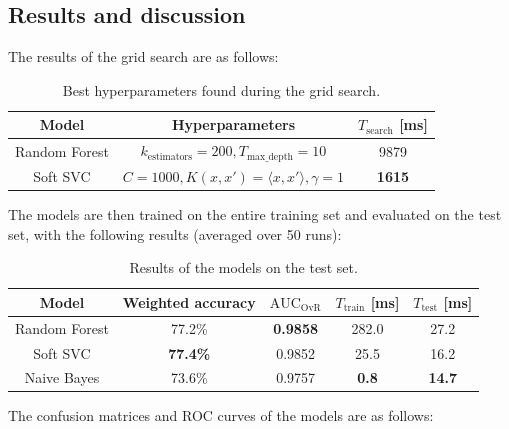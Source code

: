 \documentclass{article}
\begin{document}
\subsection{Results and discussion}
The results of the grid search are as follows:

\begin{table}[h]
    \centering
    \begin{tabular}{c|c|c}
        \toprule
        Model & Hyperparameters & $T_{\text{search}}$ [ms] \\
        \midrule
        Random Forest & $k_{\text{estimators}} = 200, T_{\text{max\_depth}} = 10$ & 9879 \\
        Soft SVC & $C = 1000, K(x, x') = \langle x, x' \rangle, \gamma = 1$ & \textbf{1615} \\
        \bottomrule
    \end{tabular}
    \caption{
        Best hyperparameters found during the grid search.
    }
    \label{tab:hyperparameters}
\end{table}

The models are then trained on the entire training set and evaluated on the test set, with the following results (averaged over 50 runs):

\begin{table}[h]
    \centering
    \begin{tabular}{c|c|c|c|c}
        \toprule
        Model & Weighted accuracy & $\text{AUC}_{\text{OvR}}$ & $T_{\text{train}}$ [ms] & $T_{\text{test}}$ [ms] \\
        \midrule
        Random Forest & 77.2\% & \textbf{0.9858} & 282.0 & 27.2 \\
        Soft SVC & \textbf{77.4\%} & 0.9852 & 25.5 & 16.2 \\
        Naive Bayes & 73.6\% & 0.9757 & \textbf{0.8} & \textbf{14.7} \\
        \bottomrule
    \end{tabular}
    \caption{
        Results of the models on the test set.
    }
    \label{tab:results}
\end{table}

The confusion matrices and ROC curves of the models are as follows:
\end{document}
